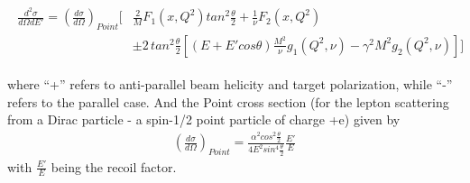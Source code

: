 \begin{comment}
\begin{eqnarray}
\label{diffXS2}
\frac{d^2\sigma}{d\Omega dE'} = \left(\frac{d\sigma}{d\Omega}\right)_{Point}
 \left( \frac{2}{M}F_1(x,Q^2) tan^2 \frac{\theta}{2} + \frac{1}{\nu} F_2(x,Q^2) \right)
\end{eqnarray}

\begin{equation*}
  \begin{aligned}
    \frac{d^2\sigma}{d\Omega dE'}  
    = \left(\frac{d\sigma}{d\Omega}\right)_{Point}  
    \Bigg[ &  %
       \frac{2}{M} F_1(x,Q^2) tan^2 \frac{\theta}{2} + \frac{1}{\nu} F_2(x,Q^2) \\
     & \pm  2\, tan^2 \frac{\theta}{2} 
     \left[   (E + E' cos\theta) \frac{M^2}{\nu} g_1(Q^2,\nu) - \gamma^2 M^2 g_2(Q^2,\nu)    \right]
     \Bigg]
  \end{aligned}
\end{equation*}

\end{comment}



\begin{eqnarray}
  \begin{aligned}
    \frac{d^2\sigma}{d\Omega dE'}  
    = \left(\frac{d\sigma}{d\Omega}\right)_{Point}  
    \Bigg[ &  %
       \frac{2}{M} F_1(x,Q^2) tan^2 \frac{\theta}{2} + \frac{1}{\nu} F_2(x,Q^2) \\
     & \pm  2\, tan^2 \frac{\theta}{2} 
     \left[   (E + E' cos\theta) \frac{M^2}{\nu} g_1(Q^2,\nu) - \gamma^2 M^2 g_2(Q^2,\nu)    \right]
     \Bigg]
  \end{aligned}
\end{eqnarray}

where ``+'' refers to anti-parallel beam helicity and target polarization, while ``-'' refers to
the parallel case.  
And the Point %
cross section (for the lepton scattering from a Dirac particle - a spin-1/2 point particle of charge +e) given by
\begin{eqnarray}
\label{MottXS}
\left(\frac{d\sigma}{d\Omega}\right)_{Point} = \frac{\alpha^2 cos^2 \frac{\theta}{2}}{4E^2 sin^4\frac{\theta}{2}}
\frac{E'}{E}
\end{eqnarray}
with $\frac{E'}{E}$ being the recoil factor.



